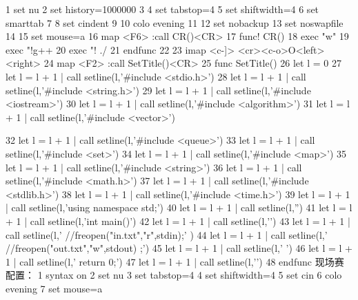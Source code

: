 \documentclass[11pt]{article}
\begin{document}
\begin{Code}
 1   set nu
 2   set history=1000000
 3
 4   set tabstop=4
 5   set shiftwidth=4
 6   set smarttab
 7
 8   set cindent
 9
10   colo evening
11
12   set nobackup
13   set noswapfile
14
15   set mouse=a
16   map <F6> :call CR()<CR>
17   func! CR()
18   exec "w"
19   exec "!g++ %
20   exec "! ./%
21   endfunc
22
23   imap <c-]> {<cr>}<c-o>O<left><right>
24   map <F2> :call SetTitle()<CR>
25   func SetTitle()
26   let l = 0
27   let l = l + 1 | call setline(l,'#include <stdio.h>')
28   let l = l + 1 | call setline(l,'#include <string.h>')
29   let l = l + 1 | call setline(l,'#include <iostream>')
30   let l = l + 1 | call setline(l,'#include <algorithm>')
31   let l = l + 1 | call setline(l,'#include <vector>')


32   let l = l + 1 | call setline(l,'#include <queue>')
33   let l = l + 1 | call setline(l,'#include <set>')
34   let l = l + 1 | call setline(l,'#include <map>')
35   let l = l + 1 | call setline(l,'#include <string>')
36   let l = l + 1 | call setline(l,'#include <math.h>')
37   let l = l + 1 | call setline(l,'#include <stdlib.h>')
38   let l = l + 1 | call setline(l,'#include <time.h>')
39   let l = l + 1 | call setline(l,'using namespace std;')
40   let l = l + 1 | call setline(l,'')
41   let l = l + 1 | call setline(l,'int main()')
42   let l = l + 1 | call setline(l,'{')
43   let l = l + 1 | call setline(l,'    //freopen("in.txt","r",stdin);'
        )
44   let l = l + 1 | call setline(l,'    //freopen("out.txt","w",stdout)
        ;')
45   let l = l + 1 | call setline(l,'    ')
46   let l = l + 1 | call setline(l,'    return 0;')
47   let l = l + 1 | call setline(l,'}')
48   endfunc
     现场赛配置：
1    syntax on
2    set nu
3    set tabstop=4
4    set shiftwidth=4
5    set cin
6    colo evening
7    set mouse=a
\end{Code}
\end{document}
